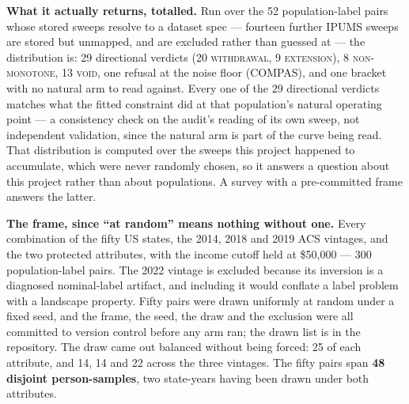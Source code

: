 \documentclass[9pt,conference]{IEEEtran}
\begin{document}
\textbf{What it actually returns, totalled.} Run over the 52 population-label pairs whose
stored sweeps resolve to a dataset spec --- fourteen further IPUMS sweeps are stored but
unmapped, and are excluded rather than guessed at --- the distribution
is: 29 directional verdicts (20 \textsc{withdrawal}, 9 \textsc{extension}), 8
\textsc{non-monotone}, 13 \textsc{void}, one refusal at the noise floor (COMPAS), and
one bracket with no natural arm to read against. Every one of the 29 directional
verdicts matches what the fitted constraint did at that population's natural operating
point --- a consistency check on the audit's reading of its own sweep, not independent
validation, since the natural arm is part of the curve being read. That distribution is computed over the sweeps this project happened to accumulate, which
were never randomly chosen, so it answers a question about this project rather than about
populations. A survey with a pre-committed frame answers the latter.

\textbf{The frame, since ``at random'' means nothing without one.} Every combination of the
fifty US states, the 2014, 2018 and 2019 ACS vintages, and the two protected attributes, with
the income cutoff held at \$50{,}000 --- 300 population-label pairs. The 2022 vintage is
excluded because its inversion is a diagnosed nominal-label artifact, and including it would
conflate a label problem with a landscape property. Fifty pairs were drawn uniformly at
random under a fixed seed, and the frame, the seed, the draw and the exclusion were all
committed to version control before any arm ran; the drawn list is in the repository. The
draw came out balanced without being forced: 25 of each attribute, and 14, 14 and 22 across
the three vintages. The fifty pairs span \textbf{48 disjoint person-samples}, two state-years
having been drawn under both attributes.
\end{document}
